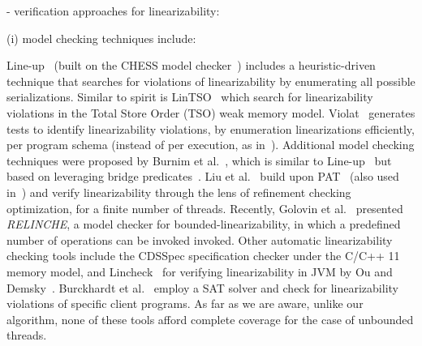 - verification approaches for linearizability:



(i) model checking techniques include:

Line-up~\cite{BuDeMuTa10} (built on the CHESS model checker~\cite{MuQaBaBaNaNe08}) includes a heuristic-driven technique that searches for violations of linearizability by enumerating all possible serializations. Similar to spirit is LinTSO~\cite{BuGoMuYa12} which search for linearizability violations in the Total Store
Order (TSO) weak memory model.
%
Violat~\cite{EmEn19} generates tests to identify linearizability violations, by 
enumeration linearizations efficiently, per program schema (instead of per 
execution, as in~\cite{BuDeMuTa10}).
%
Additional model checking techniques were proposed by Burnim et al.~\cite{BuNeSe11}, which is similar to  Line-up~\cite{BuDeMuTa10} but based on leveraging bridge predicates~\cite{BuSe09}. 
Liu et al.~\cite{LiChLiSuZhDo12} build upon PAT~\cite{SuLuDoPa09} (also used in~\cite{LiChLiSu09,Zh11}) and verify linearizability through the lens of refinement checking optimization, for a finite number of threads.
%
%
Recently, Golovin et al.~\cite{GoKoVa25} presented \textit{RELINCHE}, a model checker for bounded-linearizability, in which a predefined number of operations can be invoked invoked.
%
Other automatic linearizability checking tools include the CDSSpec specification checker under the C/C++ 11 memory model, and Lincheck~\cite{KoDeSoTsAl23} for verifying linearizability in JVM by Ou and Demsky~\cite{OuDe17}. 
%
Burckhardt et al.~\cite{BuAlMa07} employ a SAT solver and check for linearizability violations of specific client programs.
%
As far as we are aware, unlike our algorithm, none of these tools afford complete coverage for the case of unbounded threads.
%

